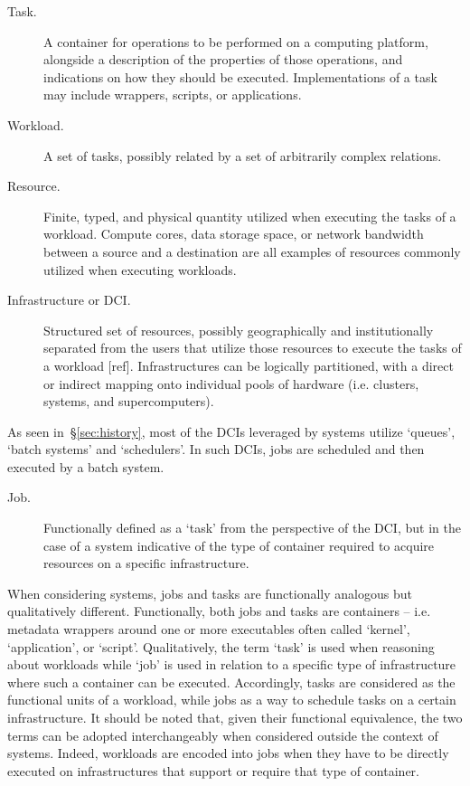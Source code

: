 \documentclass{sig-alternate}
\begin{document}
\begin{description}

\item[Task.] A container for operations to be performed on a computing
platform, alongside a description of the properties of those operations, and
indications on how they should be executed. Implementations of a task may
include wrappers, scripts, or applications.

\item[Workload.] A set of tasks, possibly related by a set of arbitrarily
complex relations.

\item[Resource.] Finite, typed, and physical quantity utilized when executing
the tasks of a workload. Compute cores, data storage space, or network
bandwidth between a source and a destination are all examples of resources
commonly utilized when executing workloads.

\item[Infrastructure or DCI.] Structured set of resources, possibly
geographically and institutionally separated from the users that utilize those
resources to execute the tasks of a workload [ref]. Infrastructures can be
logically partitioned, with a direct or indirect mapping onto individual pools
of hardware (i.e. clusters, systems, and supercomputers).

\end{description}

As seen in~\S\ref{sec:history}, most of the DCIs leveraged by \pilot systems
utilize `queues', `batch systems' and `schedulers'. In such DCIs, jobs are
scheduled and then executed by a batch system.

\begin{description}

\item[Job.] Functionally defined as a `task' from the perspective of the DCI,
but in the case of a \pilot system indicative of the type of container required
to acquire resources on a specific infrastructure.

\end{description}

When considering \pilot systems, jobs and tasks are functionally analogous but
qualitatively different. Functionally, both jobs and tasks are containers --
i.e. metadata wrappers around one or more executables often called `kernel',
`application', or `script'. Qualitatively, the term `task' is used when
reasoning about workloads while `job' is used in relation to a specific type of
infrastructure where such a container can be executed. Accordingly, tasks are
considered as the functional units of a workload, while jobs as a way to
schedule tasks on a certain infrastructure. It should be noted that, given
their functional equivalence, the two terms can be adopted interchangeably when
considered outside the context of \pilot systems. Indeed, workloads are encoded
into jobs when they have to be directly executed on infrastructures that
support or require that type of container.
\end{document}
